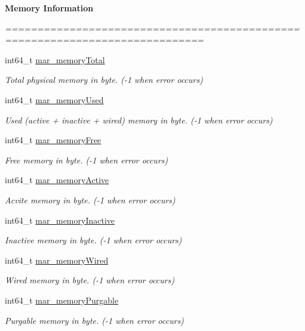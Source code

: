 \begin{Indent}\textbf{ Memory Information}\par
{\em ============================================================================= 

 }\begin{DoxyCompactItemize}
\item 
int64\+\_\+t \hyperlink{category_u_i_device_07_m_a_r_e_x_08_aee5441c8171c339e39fd5ad37c434cd2}{mar\+\_\+memory\+Total}
\begin{DoxyCompactList}\small\item\em Total physical memory in byte. (-\/1 when error occurs) \end{DoxyCompactList}\item 
int64\+\_\+t \hyperlink{category_u_i_device_07_m_a_r_e_x_08_a0f4a948dbeb77af4b3dfe470a0eefc68}{mar\+\_\+memory\+Used}
\begin{DoxyCompactList}\small\item\em Used (active + inactive + wired) memory in byte. (-\/1 when error occurs) \end{DoxyCompactList}\item 
int64\+\_\+t \hyperlink{category_u_i_device_07_m_a_r_e_x_08_a12948284369faa8f184fe4a5f6733e76}{mar\+\_\+memory\+Free}
\begin{DoxyCompactList}\small\item\em Free memory in byte. (-\/1 when error occurs) \end{DoxyCompactList}\item 
int64\+\_\+t \hyperlink{category_u_i_device_07_m_a_r_e_x_08_afc99b502ac50d6bfff2c1acb86e5aebf}{mar\+\_\+memory\+Active}
\begin{DoxyCompactList}\small\item\em Acvite memory in byte. (-\/1 when error occurs) \end{DoxyCompactList}\item 
int64\+\_\+t \hyperlink{category_u_i_device_07_m_a_r_e_x_08_a1f5e1f3c5214b36afdd866f6ac26fdab}{mar\+\_\+memory\+Inactive}
\begin{DoxyCompactList}\small\item\em Inactive memory in byte. (-\/1 when error occurs) \end{DoxyCompactList}\item 
int64\+\_\+t \hyperlink{category_u_i_device_07_m_a_r_e_x_08_a27a4c655bc7821081aa1a9ab52868bc7}{mar\+\_\+memory\+Wired}
\begin{DoxyCompactList}\small\item\em Wired memory in byte. (-\/1 when error occurs) \end{DoxyCompactList}\item 
int64\+\_\+t \hyperlink{category_u_i_device_07_m_a_r_e_x_08_a1d07c60e70768af846b16d09d68a16a4}{mar\+\_\+memory\+Purgable}
\begin{DoxyCompactList}\small\item\em Purgable memory in byte. (-\/1 when error occurs) \end{DoxyCompactList}\end{DoxyCompactItemize}
\end{Indent}
